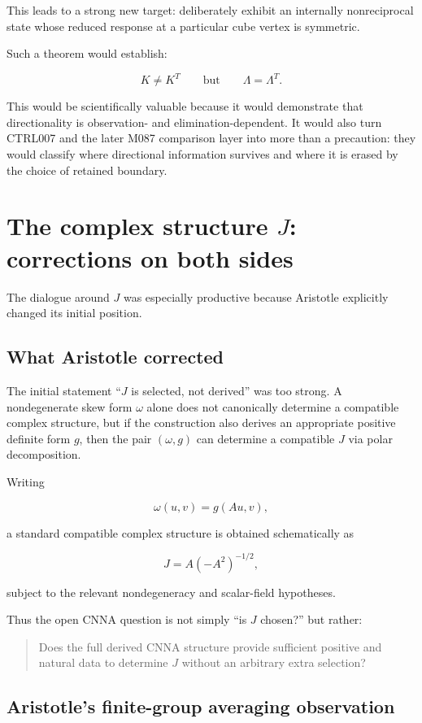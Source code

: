 \documentclass[11pt,a4paper]{article}
\begin{document}
This leads to a strong new target: deliberately exhibit an internally nonreciprocal state whose reduced response at a particular cube vertex is symmetric.

Such a theorem would establish:

\[
K\neq K^{T}
\qquad\text{but}\qquad
\Lambda=\Lambda^{T}.
\]

This would be scientifically valuable because it would demonstrate that directionality is observation- and elimination-dependent. It would also turn CTRL007 and the later M087 comparison layer into more than a precaution: they would classify where directional information survives and where it is erased by the choice of retained boundary.

\section{The complex structure $J$: corrections on both sides}

The dialogue around $J$ was especially productive because Aristotle explicitly changed its initial position.

\subsection{What Aristotle corrected}

The initial statement ``$J$ is selected, not derived'' was too strong. A nondegenerate skew form $\omega$ alone does not canonically determine a compatible complex structure, but if the construction also derives an appropriate positive definite form $g$, then the pair $(\omega,g)$ can determine a compatible $J$ via polar decomposition.

Writing

\[
\omega(u,v)=g(Au,v),
\]

a standard compatible complex structure is obtained schematically as

\[
J=A(-A^{2})^{-1/2},
\]

subject to the relevant nondegeneracy and scalar-field hypotheses.

Thus the open CNNA question is not simply ``is $J$ chosen?'' but rather:

\begin{quote}
Does the full derived CNNA structure provide sufficient positive and natural data to determine $J$ without an arbitrary extra selection?
\end{quote}

\subsection{Aristotle's finite-group averaging observation}
\end{document}
